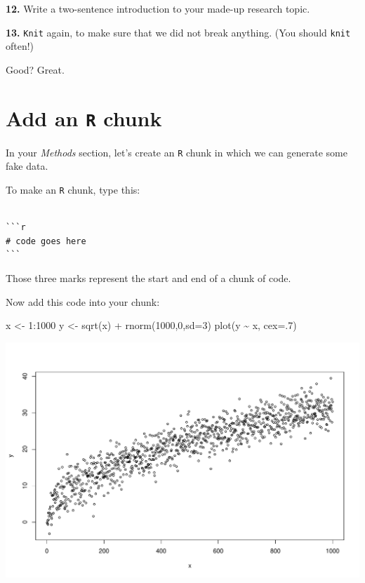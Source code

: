 \documentclass[
]{book}
\newenvironment{Shaded}{\begin{snugshade}}{\end{snugshade}}
\newcommand{\AttributeTok}[1]{\textcolor[rgb]{0.77,0.63,0.00}{#1}}
\newcommand{\DecValTok}[1]{\textcolor[rgb]{0.00,0.00,0.81}{#1}}
\newcommand{\FunctionTok}[1]{\textcolor[rgb]{0.00,0.00,0.00}{#1}}
\newcommand{\NormalTok}[1]{#1}
\newcommand{\OtherTok}[1]{\textcolor[rgb]{0.56,0.35,0.01}{#1}}
\newcommand{\SpecialCharTok}[1]{\textcolor[rgb]{0.00,0.00,0.00}{#1}}
\begin{document}
\textbf{12.} Write a two-sentence introduction to your made-up research topic.

\textbf{13.} \texttt{Knit} again, to make sure that we did not break anything. (You should \texttt{knit} often!)

Good? Great.

\hypertarget{add-an-r-chunk}{%
\section*{\texorpdfstring{Add an \texttt{R} chunk}{Add an R chunk}}\label{add-an-r-chunk}}

In your \emph{Methods} section, let's create an \texttt{R} chunk in which we can generate some fake data.

To make an \texttt{R} chunk, type this:

\begin{verbatim}

```r
# code goes here
```
\end{verbatim}

Those three marks represent the start and end of a chunk of code.

Now add this code into your chunk:

\begin{Shaded}
\begin{Highlighting}[]
\NormalTok{x }\OtherTok{\textless{}{-}} \DecValTok{1}\SpecialCharTok{:}\DecValTok{1000}
\NormalTok{y }\OtherTok{\textless{}{-}} \FunctionTok{sqrt}\NormalTok{(x) }\SpecialCharTok{+} \FunctionTok{rnorm}\NormalTok{(}\DecValTok{1000}\NormalTok{,}\DecValTok{0}\NormalTok{,}\AttributeTok{sd=}\DecValTok{3}\NormalTok{)}
\FunctionTok{plot}\NormalTok{(y }\SpecialCharTok{\textasciitilde{}}\NormalTok{ x, }\AttributeTok{cex=}\NormalTok{.}\DecValTok{7}\NormalTok{)}
\end{Highlighting}
\end{Shaded}

\includegraphics[width=694.08px]{figures/unnamed-chunk-212-1}
\end{document}
